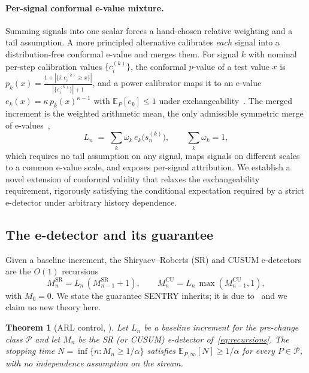 \documentclass[pdflatex,sn-mathphys-num]{sn-jnl}%
\theoremstyle{thmstyleone}%
\newtheorem{theorem}{Theorem}%
\theoremstyle{thmstyletwo}%
\theoremstyle{thmstylethree}%
\newcommand{\Ecal}{\mathbb{E}}
\newcommand{\Pcal}{\mathcal{P}}
\begin{document}
\paragraph{Per-signal conformal e-value mixture.} Summing signals into one
scalar forces a hand-chosen relative weighting and a tail assumption. A more
principled alternative calibrates \emph{each} signal into a distribution-free
conformal e-value and merges them. For signal \(k\) with nominal
per-step calibration values \(\{c^{(k)}_i\}\), the conformal
\(p\)-value of a test value \(x\) is
\(p_k(x)=\frac{1+|\{i:c^{(k)}_i\ge x\}|}{|\{c^{(k)}_i\}|+1}\), and a
power calibrator maps it to an e-value \(e_k(x)=\kappa\,p_k(x)^{\kappa-1}\)
with \(\Ecal_P[e_k]\le 1\) under exchangeability~\cite{vovk2021evalues}. The
merged increment is the weighted arithmetic mean, the only admissible
symmetric merge of e-values~\cite{vovk2021evalues},
\begin{equation}
L_n \;=\; \sum_{k} \omega_k\, e_k\!\bigl(s^{(k)}_n\bigr),
\qquad \sum_k \omega_k = 1,
\label{eq:evalue-mix}
\end{equation}
which requires no tail assumption on any signal, maps signals on different 
scales to a common e-value scale, and exposes per-signal attribution. We establish 
a novel extension of conformal validity that relaxes the exchangeability requirement, 
rigorously satisfying the conditional expectation required by a strict e-detector 
under arbitrary history dependence.

\subsection{The e-detector and its guarantee}

Given a baseline increment, the Shiryaev--Roberts (SR) and CUSUM e-detectors
are the \(O(1)\) recursions~\cite{shin2023edetectors}
\begin{equation}
M^{\mathrm{SR}}_n = L_n\,(M^{\mathrm{SR}}_{n-1}+1), \qquad
M^{\mathrm{CU}}_n = L_n\,\max(M^{\mathrm{CU}}_{n-1},1),
\label{eq:recursions}
\end{equation}
with \(M_0=0\). We state the guarantee SENTRY inherits; it is due
to~\cite{shin2023edetectors} and we claim no new theory here.

\begin{theorem}[ARL control, {\cite[Thm.~2.4]{shin2023edetectors}}]
\label{thm:arl}
Let \(L_n\) be a baseline increment for the pre-change class \(\Pcal\) and let
\(M_n\) be the SR (or CUSUM) e-detector of~\eqref{eq:recursions}. The stopping
time \(N=\inf\{n: M_n\ge 1/\alpha\}\) satisfies \(\Ecal_{P,\infty}[N]\ge
1/\alpha\) for every \(P\in\Pcal\), with no independence assumption on the
stream.
\end{theorem}
\end{document}
